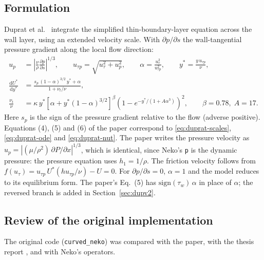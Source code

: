 \documentclass[11pt,a4paper]{article}
\newcommand{\code}[1]{\texttt{#1}}
\newcommand{\up}{u_p}
\newcommand{\utau}{u_\tau}
\newcommand{\utp}{u_{\tau p}}
\newcommand{\dpds}{\partial p/\partial s}
\begin{document}
\subsection{Formulation}
\label{sec:duprat-formulation}

Duprat et al.\ \cite{duprat2011} integrate the simplified thin-boundary-layer
equation across the wall layer, using an extended velocity scale. With
$\dpds$ the wall-tangential pressure gradient along the local flow
direction:
\begin{align}
  \up &= \left|\frac{\nu}{\rho}\frac{\partial p}{\partial s}\right|^{1/3},
  \qquad
  \utp = \sqrt{\utau^2 + \up^2},
  \qquad
  \alpha = \frac{\utau^2}{\utp^2},
  \qquad
  y^* = \frac{y\,\utp}{\nu},
  \label{eq:duprat-scales}\\
  \frac{\mathrm{d}U^*}{\mathrm{d}y^*} &=
    \frac{s_p\,(1-\alpha)^{3/2}\,y^* + \alpha}{1 + \nu_t/\nu},
  \label{eq:duprat-ode}\\
  \frac{\nu_t}{\nu} &= \kappa\,y^*\left[\alpha + y^*(1-\alpha)^{3/2}\right]^\beta
    \left(1 - e^{-y^*/(1+A\alpha^3)}\right)^2,
  \qquad \beta = 0.78,\; A = 17.
  \label{eq:duprat-nut}
\end{align}
Here $s_p$ is the sign of the pressure gradient relative to the flow
(adverse positive). Equations (4), (5) and (6) of the paper correspond to
\eqref{eq:duprat-scales}, \eqref{eq:duprat-ode} and \eqref{eq:duprat-nut}.
The paper writes the pressure velocity as
$\up = |(\mu/\rho^2)\,\partial P/\partial x|^{1/3}$, which is identical,
since Neko's \code{p} is the dynamic pressure: the pressure equation uses
$h_1 = 1/\rho$. The friction velocity follows from
$f(\utau) = \utp\,U^*(h\utp/\nu) - U = 0$. For $\dpds = 0$, $\alpha = 1$
and the model reduces to its equilibrium form. The paper's Eq.~(5) has
$\mathrm{sign}(\tau_w)\,\alpha$ in place of $\alpha$; the reversed
branch is added in Section~\ref{sec:dupv2}.

\subsection{Review of the original implementation}
\label{sec:duprat-review}

The original code (\code{curved\_neko}) was compared with the paper, with the
thesis report \cite{bole2026}, and with Neko's operators.
\end{document}
